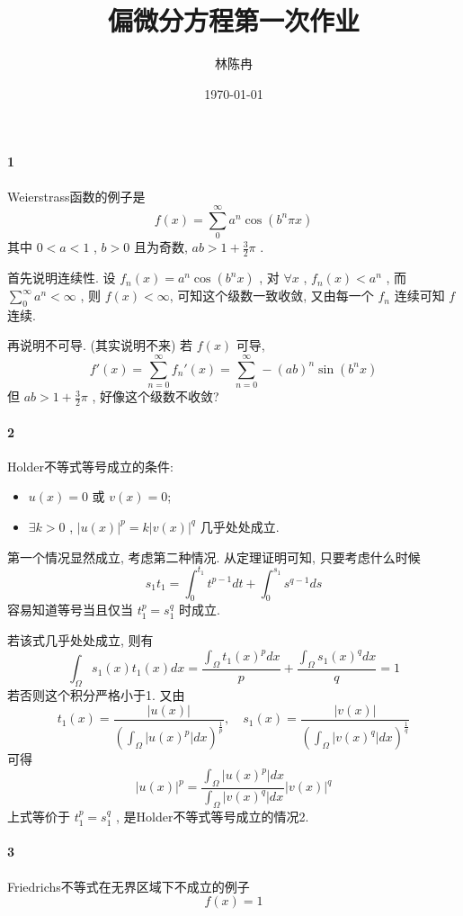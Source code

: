 \documentclass[a4paper, UTF8]{ctexart}				%
\title{偏微分方程第一次作业}
\author{林陈冉}
\date{\today}
\numberwithin{equation}{section}				%
\begin{document}
    \maketitle										%
    \paragraph{1}
        Weierstrass函数的例子是 
        \[
            f(x) = \sum^{\infty}_{0} a^n \cos (b^n \pi x)
        \]
        其中 $0 < a < 1$ , $b > 0$ 且为奇数, $ab > 1 + \frac{3}{2}\pi$ .

        首先说明连续性. 设 $f_n(x) = a^n \cos (b^n x)$ , 对 $\forall x$ , $f_n(x) < a^n$ , 而 $\sum^{\infty}_{0} a^n < \infty$ , 则 $f(x) < \infty$, 可知这个级数一致收敛, 又由每一个 $f_n$ 连续可知 $f$ 连续.
        
        再说明不可导. (其实说明不来) 若 $f(x)$ 可导, 
        \[
            f'(x) = \sum^{\infty}_{n=0} f_n'(x) = \sum^{\infty}_{n=0} - (ab)^n \sin (b^n x)
        \]
        但 $ab > 1 + \frac{3}{2} \pi$ , 好像这个级数不收敛?

    \paragraph{2}
        Holder不等式等号成立的条件: 
        \begin{itemize}
            \item $u(x) = 0$ 或 $v(x)=0$;
            \item $\exists k > 0$ , $\vert{u(x)}\vert^p = k \vert{v(x)}\vert^q$ 几乎处处成立.
        \end{itemize}

        第一个情况显然成立, 考虑第二种情况. 从定理证明可知, 只要考虑什么时候 
        \[
            s_1 t_1 = \int^{t_1}_{0} t^{p - 1}dt + \int^{s_1}_{0} s^{q - 1}ds
        \]
        容易知道等号当且仅当 $t_1^p = s_1^q$ 时成立.
        
        若该式几乎处处成立, 则有 
        \[
            \int^{}_{\Omega}s_1(x) t_1(x)dx = \frac{\int^{}_{\Omega} t_1(x)^pdx}{p} + \frac{\int^{}_{\Omega} s_1(x)^qdx}{q} = 1
        \]
        若否则这个积分严格小于1. 又由 
        \[
            t_1(x) = \frac{\vert{u(x)}\vert}{(\int^{}_{\Omega} \vert{u(x)^p}\vert dx)^{\frac{1}{p}}} , 
            \quad 
            s_1(x) = \frac{\vert{v(x)}\vert}{(\int^{}_{\Omega} \vert{v(x)^q}\vert dx)^{\frac{1}{q}}}
        \]
        可得 
        \[
            \vert{u(x)}\vert^p = \frac{\int^{}_{\Omega} \vert{u(x)^p}\vert dx}{\int^{}_{\Omega} \vert{v(x)^q}\vert dx} \vert{v(x)}\vert^q
        \]
        上式等价于 $t_1^p = s_1^q$ , 是Holder不等式等号成立的情况2.

    \paragraph{3} Friedrichs不等式在无界区域下不成立的例子 
    \[
        f(x) = 1
    \]
\end{document}
